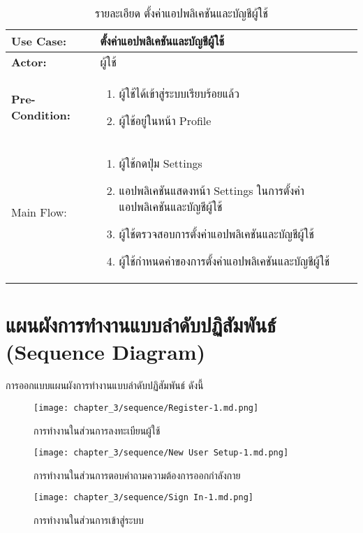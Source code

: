 \begin{table}
    \caption{รายละเอียด ตั้งค่าแอปพลิเคชันและบัญชีผู้ใช้}
    \begin{tabularx}{\textwidth}{ | >{\centering\bf} p{3cm} | X |}
        \hline
        Use Case: & ตั้งค่าแอปพลิเคชันและบัญชีผู้ใช้ \\\hline
        Actor: & ผู้ใช้ \\\hline
        Pre-Condition: &
        \begin{enumerate}[table]
            \item ผู้ใช้ได้เข้าสู่ระบบเรียบร้อยแล้ว
            \item ผู้ใช้อยู่ในหน้า Profile            
        \end{enumerate} \\\hline
        
        Main Flow: & 
        \begin{enumerate}[table]
            \item ผู้ใช้กดปุ่ม Settings
            \item แอปพลิเคชันแสดงหน้า Settings ในการตั้งค่าแอปพลิเคชันและบัญชีผู้ใช้
            \item ผู้ใช้ตรวจสอบการตั้งค่าแอปพลิเคชันและบัญชีผู้ใช้
            \item ผู้ใช้กำหนดค่าของการตั้งค่าแอปพลิเคชันและบัญชีผู้ใช้            
        \end{enumerate}\\\hline
    \end{tabularx}
\end{table}
\clearpage

\section{แผนผังการทำงานแบบลำดับปฏิสัมพันธ์ (Sequence Diagram)}
การออกแบบแผนผังการทำงานแบบลำดับปฏิสัมพันธ์ ดังนี้

\begin{figure}
    \texttt{[image: chapter\_3/sequence/Register-1.md.png]}
    \caption{การทำงานในส่วนการลงทะเบียนผู้ใช้}
\end{figure}

\begin{figure}
    \texttt{[image: chapter\_3/sequence/New User Setup-1.md.png]}
    \caption{การทำงานในส่วนการตอบคำถามความต้องการออกกำลังกาย}
\end{figure}

\begin{figure}
    \texttt{[image: chapter\_3/sequence/Sign In-1.md.png]}
    \caption{การทำงานในส่วนการเข้าสู่ระบบ}
\end{figure}

